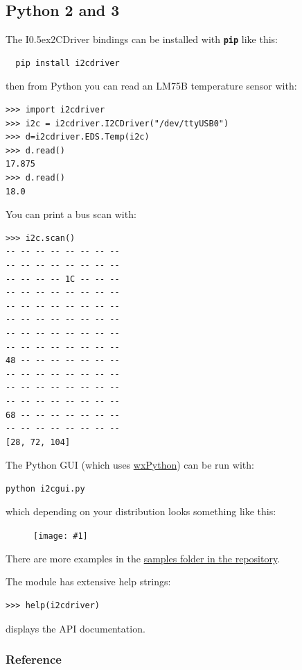 \documentclass{article}
\newcommand{\two}{\raise0.5ex\hbox{\footnotesize{2}}}
\newcommand{\iicdriver}{I\two{}CDriver}
\newcommand{\png}[1]{
\begin{figure}[H]
\begin{center}
\texttt{[image: \#1]}
\end{center}
\end{figure}
}
\newcommand{\mach}[1]{\texttt{\textbf{#1}}}
\begin{document}
\subsection{Python 2 and 3}

The \iicdriver{} bindings can be installed with \mach{pip} like this:

\begin{lstlisting}
  pip install i2cdriver
\end{lstlisting}

then from Python you can read an LM75B temperature sensor with:

\begin{lstlisting}
>>> import i2cdriver
>>> i2c = i2cdriver.I2CDriver("/dev/ttyUSB0")
>>> d=i2cdriver.EDS.Temp(i2c)
>>> d.read()
17.875
>>> d.read()
18.0
\end{lstlisting}

You can print a bus scan with:

\begin{lstlisting}
>>> i2c.scan()
-- -- -- -- -- -- -- -- 
-- -- -- -- -- -- -- -- 
-- -- -- -- 1C -- -- -- 
-- -- -- -- -- -- -- -- 
-- -- -- -- -- -- -- -- 
-- -- -- -- -- -- -- -- 
-- -- -- -- -- -- -- -- 
-- -- -- -- -- -- -- -- 
48 -- -- -- -- -- -- -- 
-- -- -- -- -- -- -- -- 
-- -- -- -- -- -- -- -- 
-- -- -- -- -- -- -- -- 
68 -- -- -- -- -- -- -- 
-- -- -- -- -- -- -- -- 
[28, 72, 104]
\end{lstlisting}

The Python GUI (which uses \href{https://www.wxpython.org/pages/downloads/}{wxPython}) can be run with:

\begin{lstlisting}
python i2cgui.py
\end{lstlisting}

which depending on your distribution looks something like this:

\png{img/i2cdriver/win32-gui}

There are more examples in the 
\href{https://github.com/jamesbowman/i2cdriver/tree/master/python/samples}{samples folder in the repository}.

The module has extensive help strings:
\begin{lstlisting}
>>> help(i2cdriver)
\end{lstlisting}
displays the API documentation.

\newpage
\subsubsection{Reference}
\let\spxentry \sphinxstyleindexentry
\let\spxextra \sphinxstyleindexextra
\end{document}

